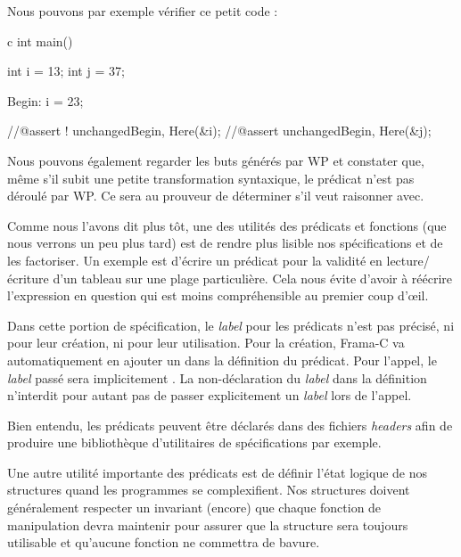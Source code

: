 Nous pouvons par exemple vérifier ce petit code :



\begin{CodeBlock}{c}
int main(){
  int i = 13;
  int j = 37;

 Begin:
  i = 23;
 
  //@assert ! unchanged{Begin, Here}(&i);
  //@assert   unchanged{Begin, Here}(&j);
}
\end{CodeBlock}



Nous pouvons également regarder les buts générés par WP et constater que, 
même s'il subit une petite transformation syntaxique, le prédicat n'est pas 
déroulé par WP. Ce sera au prouveur de déterminer s'il veut raisonner avec.



Comme nous l'avons dit plus tôt, une des utilités des prédicats et fonctions (que 
nous verrons un peu plus tard) est de rendre plus lisible nos spécifications et 
de les factoriser. Un exemple est d'écrire un prédicat pour la validité en 
lecture/écriture d'un tableau sur une plage particulière. Cela nous évite d'avoir
à réécrire l'expression en question qui est moins compréhensible au premier 
coup d’œil.






Dans cette portion de spécification, le \textit{label} pour les prédicats n'est pas 
précisé, ni pour leur création, ni pour leur utilisation. Pour la création, 
Frama-C va automatiquement en ajouter un dans la définition du prédicat. 
Pour l'appel, le \textit{label} passé sera implicitement . La non-déclaration
du \textit{label} dans la définition n'interdit pour autant pas de passer explicitement
un \textit{label} lors de l'appel.



Bien entendu, les prédicats peuvent être déclarés dans des fichiers \textit{headers} afin
de produire une bibliothèque d'utilitaires de spécifications par exemple.





Une autre utilité importante des prédicats est de définir l'état logique de nos
structures quand les programmes se complexifient. Nos structures doivent 
généralement respecter un invariant (encore) que chaque fonction de manipulation
devra maintenir pour assurer que la structure sera toujours utilisable et 
qu'aucune fonction ne commettra de bavure.



